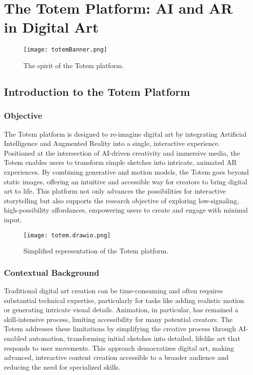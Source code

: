 \section{The Totem Platform: AI and AR in Digital Art}

\begin{figure}[!h]
    \centering
    \texttt{[image: totemBanner.png]}
    \caption{The spirit of the Totem platform.}
    \vspace{0.1cm}
    \label{fig:spiritofTotem}
\end{figure}

\subsection{ Introduction to the Totem Platform}

\subsubsection{Objective}

The Totem platform is designed to re-imagine digital art by integrating Artificial Intelligence and Augmented Reality into a single, interactive experience.
Positioned at the intersection of AI-driven creativity and immersive media, the Totem enables users to transform simple sketches into intricate, animated AR experiences.
By combining generative and motion models, the Totem goes beyond static images, offering an intuitive and accessible way for creators to bring digital art to life.
This platform not only advances the possibilities for interactive storytelling but also supports the research objective of exploring low-signaling, high-possibility affordances, empowering users to create and engage with minimal input.

\begin{figure}[!h]
    \centering
    \texttt{[image: totem.drawio.png]}
    \caption{Simplified representation of the Totem platform.}
    \vspace{0.1cm}
    \label{fig:totemImage}
\end{figure}

\subsubsection{Contextual Background}
Traditional digital art creation can be time-consuming and often requires substantial technical expertise, particularly for tasks like adding realistic motion or generating intricate visual details.
Animation, in particular, has remained a skill-intensive process, limiting accessibility for many potential creators.
The Totem addresses these limitations by simplifying the creative process through AI-enabled automation, transforming initial sketches into detailed, lifelike art that responds to user movements.
This approach democratizes digital art, making advanced, interactive content creation accessible to a broader audience and reducing the need for specialized skills.


